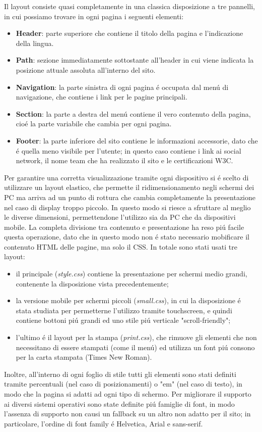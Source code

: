 \documentclass[10pt,a4paper,onecolumn]{article}
\begin{document}
Il layout consiste quasi completamente in una classica disposizione a tre pannelli, in cui possiamo trovare in ogni pagina i seguenti elementi:
\begin{itemize}
 \item \textbf{Header}: parte superiore che contiene il titolo della pagina e l'indicazione della lingua.
 \item \textbf{Path}: sezione immediatamente sottostante all'header in cui viene indicata la posizione attuale assoluta all'interno del sito.
 \item \textbf{Navigation}: la parte sinistra di ogni pagina \'e occupata dal men\'u di navigazione, che contiene i link per le pagine principali.
 \item \textbf{Section}: la parte a destra del men\'u contiene il vero contenuto della pagina, cio\'e la parte variabile che cambia per ogni pagina.
 \item \textbf{Footer}: la parte inferiore del sito contiene le informazioni accessorie, dato che \'e quella meno visibile per l'utente; in questo caso contiene i link ai social network, il nome team che ha realizzato il sito e le certificazioni W3C.
\end{itemize}
Per garantire una corretta visualizzazione tramite ogni dispositivo si \'e scelto di utilizzare un layout elastico, che permette il ridimensionamento negli schermi dei PC ma arriva ad un punto di rottura che cambia completamente la presentazione nel caso di display troppo piccolo. In questo modo si riesce a sfruttare al meglio le diverse dimensioni, permettendone l'utilizzo sia da PC che da dispositivi mobile.
La completa divisione tra contenuto e presentazione ha reso pi\'u facile questa operazione, dato che in questo modo non \'e stato necessario mobificare il contenuto HTML delle pagine, ma solo il CSS.
In totale sono stati usati tre layout:
\begin{itemize}
 \item il principale (\textit{style.css}) contiene la presentazione per schermi medio grandi, contenente la disposizione vista precedentemente;
 \item la versione mobile per schermi piccoli (\textit{small.css}), in cui la disposizione \'e stata studiata per permetterne l'utilizzo tramite touchscreen, e quindi contiene bottoni pi\'u grandi ed uno stile pi\'u verticale "scroll-friendly";
 \item l'ultimo \'e il layout per la stampa (\textit{print.css}), che rimuove gli elementi che non necessitano di essere stampati (come il men\'u) ed utilizza un font pi\'u consono per la carta stampata (Times New Roman).
\end{itemize}
Inoltre, all'interno di ogni foglio di stile tutti gli elementi sono stati definiti tramite percentuali (nel caso di posizionamenti) o "em" (nel caso di testo), in modo che la pagina si adatti ad ogni tipo di schermo.
Per migliorare il supporto ai diversi sistemi operativi sono state definite pi\'u famiglie di font, in modo l'assenza di supporto non causi un fallback su un altro non adatto per il sito; in particolare, l'ordine di font family \'e Helvetica, Arial e sans-serif.
\end{document}
